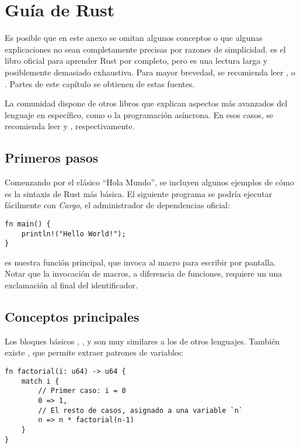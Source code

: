 
\chapter{Guía de Rust}\label{annex:rust}

Es posible que en este anexo se omitan algunos conceptos o que algunas
explicaciones no sean completamente precisas por razones de simplicidad.
 es el libro oficial para aprender Rust por completo, pero es
una lectura larga y posiblemente demasiado exhaustiva. Para mayor brevedad, se
recomienda leer ,  o
. Partes de este capítulo se obtienen de estas fuentes.

La comunidad dispone de otros libros que explican aspectos más avanzados del
lenguaje en específico, como \unsafe o la programación asíncrona. En esos casos,
se recomienda leer  y ,
respectivamente.

\section{Primeros pasos}

Comenzando por el clásico ``Hola Mundo'', se incluyen algunos ejemplos de cómo
es la sintaxis de Rust más básica. El siguiente programa se podría ejecutar
fácilmente con \emph{Cargo}, el administrador de dependencias oficial:

\begin{verbatim}
fn main() {
    println!("Hello World!");
}
\end{verbatim}

 es nuestra función principal, que invoca al macro 
para escribir por pantalla. Notar que la invocación de macros, a diferencia de
funciones, requiere un una exclamación al final del identificador.

\section{Conceptos principales}

Los bloques básicos , ,  y  son muy
similares a los de otros lenguajes. También existe , que permite
extraer patrones de variables:

\begin{verbatim}
fn factorial(i: u64) -> u64 {
    match i {
        // Primer caso: i = 0
        0 => 1,
        // El resto de casos, asignado a una variable `n`
        n => n * factorial(n-1)
    }
}
\end{verbatim}

